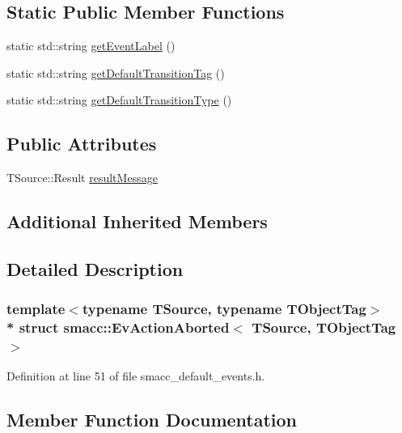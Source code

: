\subsection*{Static Public Member Functions}
\begin{DoxyCompactItemize}
\item 
static std\+::string \hyperlink{structsmacc_1_1EvActionAborted_afc9da88d5363116570d72f40b488616b}{get\+Event\+Label} ()
\item 
static std\+::string \hyperlink{structsmacc_1_1EvActionAborted_ad7b74030e2d6b7a0283de468999af421}{get\+Default\+Transition\+Tag} ()
\item 
static std\+::string \hyperlink{structsmacc_1_1EvActionAborted_a840d23255ba65123402c5afbecf75f65}{get\+Default\+Transition\+Type} ()
\end{DoxyCompactItemize}
\subsection*{Public Attributes}
\begin{DoxyCompactItemize}
\item 
T\+Source\+::\+Result \hyperlink{structsmacc_1_1EvActionAborted_acbade691390eb625282f93139a4b9f33}{result\+Message}
\end{DoxyCompactItemize}
\subsection*{Additional Inherited Members}


\subsection{Detailed Description}
\subsubsection*{template$<$typename T\+Source, typename T\+Object\+Tag$>$\\*
struct smacc\+::\+Ev\+Action\+Aborted$<$ T\+Source, T\+Object\+Tag $>$}



Definition at line 51 of file smacc\+\_\+default\+\_\+events.\+h.



\subsection{Member Function Documentation}
